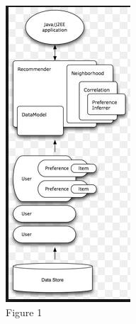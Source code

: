 \documentclass[12pt]{article} %
\begin{document}
\begin{figure}
\centering
\begin{subfigure}{.5\textwidth}
  \centering
  \includegraphics[width=0.7\linewidth]{flow1.jpg}
  \caption{Figure 1}
  \label{fig:sub1}
\end{subfigure}%
\begin{subfigure}{.5\textwidth}
  \centering

\end{subfigure}
\end{figure}
\end{document}
